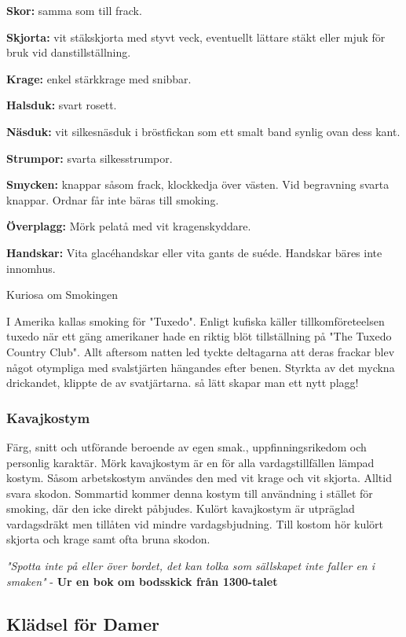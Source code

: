     \textbf{Skor:} samma som till frack.

    \textbf{Skjorta:} vit stäkskjorta med styvt veck, eventuellt lättare stäkt eller mjuk för bruk vid danstillställning.

    \textbf{Krage:} enkel stärkkrage med snibbar.

    \textbf{Halsduk:} svart rosett.

    \textbf{Näsduk:} vit silkesnäsduk i bröstfickan som ett smalt band synlig ovan dess kant.

    \textbf{Strumpor:} svarta silkesstrumpor.

    \textbf{Smycken:} knappar såsom frack, klockkedja över västen. Vid begravning svarta knappar. Ordnar får inte bäras till smoking.

    \textbf{Överplagg:} Mörk pelatå med vit kragenskyddare.

    \textbf{Handskar:} Vita glacéhandskar eller vita gants de suéde. Handskar bäres inte innomhus.

    Kuriosa om Smokingen

    I Amerika kallas smoking för "Tuxedo". Enligt kufiska käller tillkomföreteelsen tuxedo när ett gäng amerikaner hade en riktig blöt tillställning på "The Tuxedo Country Club". Allt aftersom natten led tyckte deltagarna att deras frackar blev något otympliga med svalstjärten hängandes efter benen. Styrkta av det myckna drickandet, klippte de av svatjärtarna. så lätt skapar man ett nytt plagg!

    \subsubsection{\textbf{Kavajkostym}}

    Färg, snitt och utförande beroende av egen smak., uppfinningsrikedom och personlig karaktär. Mörk kavajkostym är en för alla vardagstillfällen lämpad kostym. Såsom arbetskostym användes den med vit krage och vit skjorta. Alltid svara skodon. Sommartid kommer denna kostym till användning i stället för smoking, där den icke direkt påbjudes. Kulört kavajkostym är utpräglad vardagsdräkt men tillåten vid mindre vardagsbjudning. Till kostom hör kulört skjorta och krage samt ofta bruna skodon.

    \textit{"Spotta inte på eller över bordet, det kan tolka som sällskapet inte faller en i smaken"} - \textbf{Ur en bok om bodsskick från 1300-talet}

    \subsection{\textbf{Klädsel för Damer}}
